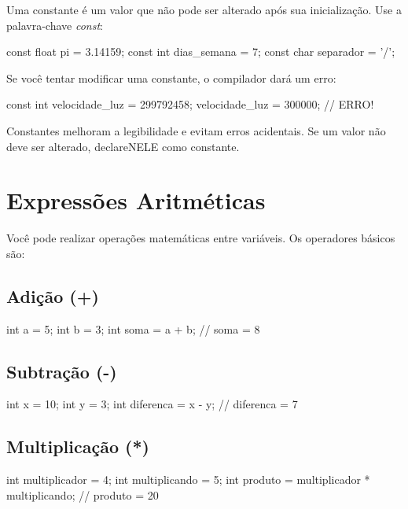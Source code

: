 Uma constante é um valor que não pode ser alterado após sua inicialização. Use a palavra-chave \textit{const}:

\begin{ccode}
  const float pi = 3.14159;
  const int dias_semana = 7;
  const char separador = '/';
\end{ccode}

Se você tentar modificar uma constante, o compilador dará um erro:

\begin{ccode}
  const int velocidade_luz = 299792458;
  velocidade_luz = 300000;  // ERRO!
\end{ccode}

Constantes melhoram a legibilidade e evitam erros acidentais. Se um valor não deve ser alterado, declareNELE como constante.

\section{Expressões Aritméticas}

Você pode realizar operações matemáticas entre variáveis. Os operadores básicos são:

\subsection{Adição (+)}

\begin{ccode}
  int a = 5;
  int b = 3;
  int soma = a + b;  // soma = 8
\end{ccode}

\subsection{Subtração (-)}

\begin{ccode}
  int x = 10;
  int y = 3;
  int diferenca = x - y;  // diferenca = 7
\end{ccode}

\subsection{Multiplicação (*)}

\begin{ccode}
  int multiplicador = 4;
  int multiplicando = 5;
  int produto = multiplicador * multiplicando;  // produto = 20
\end{ccode}

